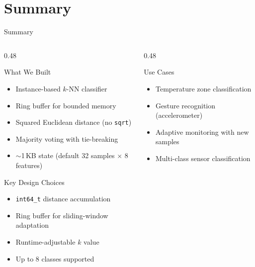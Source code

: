 \documentclass[aspectratio=169, 10pt]{beamer}
\begin{document}
\section{Summary}

\begin{frame}{Summary}
\begin{columns}[T]
\begin{column}{0.48\textwidth}
\begin{block}{What We Built}
\begin{itemize}
  \item Instance-based $k$-NN classifier
  \item Ring buffer for bounded memory
  \item Squared Euclidean distance (no \texttt{sqrt})
  \item Majority voting with tie-breaking
  \item $\sim$1\,KB state (default 32 samples $\times$ 8 features)
\end{itemize}
\end{block}

\begin{block}{Key Design Choices}
\begin{itemize}
  \item \texttt{int64\_t} distance accumulation
  \item Ring buffer for sliding-window adaptation
  \item Runtime-adjustable $k$ value
  \item Up to 8 classes supported
\end{itemize}
\end{block}
\end{column}

\begin{column}{0.48\textwidth}
\begin{block}{Use Cases}
\begin{itemize}
  \item Temperature zone classification
  \item Gesture recognition (accelerometer)
  \item Adaptive monitoring with new samples
  \item Multi-class sensor classification
\end{itemize}
\end{block}


\end{column}
\end{columns}
\end{frame}
\end{document}
